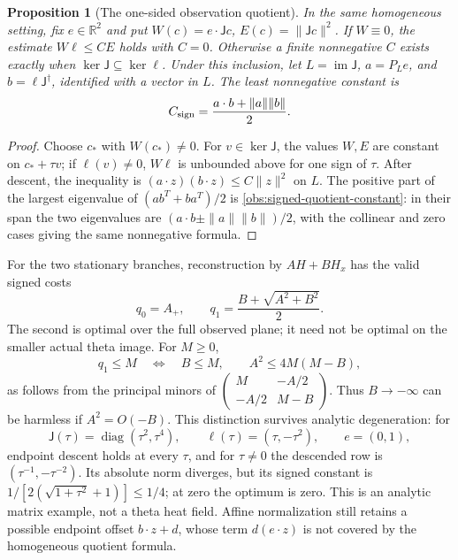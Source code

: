 \documentclass[11pt]{article}
\numberwithin{equation}{section}
\newtheorem{proposition}[theorem]{Proposition}
\theoremstyle{definition}
\theoremstyle{remark}
\newcommand{\R}{\mathbb R}
\begin{document}
\begin{proposition}[The one-sided observation quotient]
\label{obs:signed-quotient}
In the same homogeneous setting, fix $e\in\R^2$ and put
$W(c)=e\cdot\mathsf Jc$, $E(c)=\|\mathsf Jc\|^2$.
If $W\equiv0$, the estimate $W\ell\le CE$ holds with $C=0$.
Otherwise a finite nonnegative $C$ exists exactly when
$\ker\mathsf J\subseteq\ker\ell$.
Under this inclusion, let $L=\operatorname{im}\mathsf J$,
$a=P_Le$, and $b=\ell\mathsf J^\dagger$, identified with a
vector in $L$. The least nonnegative constant is
\begin{equation}
 C_{\rm sign}=\frac{a\cdot b+\|a\|\|b\|}{2}.
 \label{obs:signed-quotient-constant}
\end{equation}
\end{proposition}
\begin{proof}
Choose $c_*$ with $W(c_*)\ne0$. For $v\in\ker\mathsf J$,
the values $W,E$ are constant on $c_*+\tau v$; if $\ell(v)\ne0$,
$W\ell$ is unbounded above for one sign of $\tau$.
After descent, the inequality is
$(a\cdot z)(b\cdot z)\le C\|z\|^2$ on $L$.
The positive part of the largest eigenvalue of
$(ab^T+ba^T)/2$ is \eqref{obs:signed-quotient-constant}:
in their span the two eigenvalues are
$(a\cdot b\pm\|a\|\|b\|)/2$, with the collinear and zero
cases giving the same nonnegative formula.
\end{proof}

For the two stationary branches, reconstruction by $AH+BH_x$ has
the valid signed costs
\begin{equation}
 q_0=A_+,\qquad q_1=\frac{B+\sqrt{A^2+B^2}}2.
 \label{obs:physical-signed-costs}
\end{equation}
The second is optimal over the full observed plane; it need not be
optimal on the smaller actual theta image. For $M\ge0$,
\begin{equation}
 q_1\le M\quad\Longleftrightarrow\quad
 B\le M,\qquad A^2\le4M(M-B),
 \label{obs:signed-cost-parabola}
\end{equation}
as follows from the principal minors of
$\left(\begin{smallmatrix}M&-A/2\\-A/2&M-B\end{smallmatrix}\right)$.
Thus $B\to-\infty$ can be harmless if $A^2=O(-B)$.
This distinction survives analytic degeneration: for
\[
 \mathsf J(\tau)=\operatorname{diag}(\tau^2,\tau^4),\qquad
 \ell(\tau)=(\tau,-\tau^2),\qquad e=(0,1),
\]
endpoint descent holds at every $\tau$, and for $\tau\ne0$
the descended row is $(\tau^{-1},-\tau^{-2})$.
Its absolute norm diverges, but its signed constant is
$1/[2(\sqrt{1+\tau^2}+1)]\le1/4$; at zero the optimum is zero.
This is an analytic matrix example, not a theta heat field.
Affine normalization still retains a possible endpoint offset
$b\cdot z+d$, whose term $d(e\cdot z)$ is not covered by the
homogeneous quotient formula.
\end{document}
